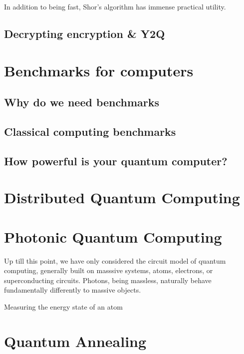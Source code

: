 \documentclass{book}
\begin{document}
In addition to being fast, Shor's algorithm has immense practical utility. 

\section{Decrypting encryption \& Y2Q}


\chapter{Benchmarks for computers}

\section{Why do we need benchmarks}

\section{Classical computing benchmarks}

\section{How powerful is your quantum computer?}

\chapter{Distributed Quantum Computing}


\chapter{Photonic Quantum Computing}


Up till this point, we have only considered the circuit model of quantum computing, generally built on masssive systems, atoms, electrons, or superconducting circuits. Photons, being massless, naturally behave fundamentally differently to massive objects. 

Measuring the energy state of an atom

\chapter{ Quantum Annealing}
\end{document}
